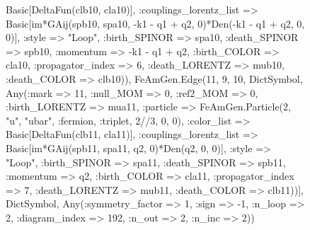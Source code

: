 \documentclass{revtex4}
\begin{document}
\begin{figure}[!htb]
\begin{center}
{Basic[DeltaFun(clb10, cla10)], :couplings_lorentz_list => Basic[im*GAij(spb10, spa10, -k1 - q1 + q2, 0)*Den(-k1 - q1 + q2, 0, 0)], :style => "Loop", :birth_SPINOR => spa10, :death_SPINOR => spb10, :momentum => -k1 - q1 + q2, :birth_COLOR => cla10, :propagator_index => 6, :death_LORENTZ => mub10, :death_COLOR => clb10)), FeAmGen.Edge(11, 9, 10, Dict{Symbol, Any}(:mark => 11, :null_MOM => 0, :ref2_MOM => 0, :birth_LORENTZ => mua11, :particle => FeAmGen.Particle(2, "u", "ubar", :fermion, :triplet, 2//3, 0, 0), :color_list => Basic[DeltaFun(clb11, cla11)], :couplings_lorentz_list => Basic[im*GAij(spb11, spa11, q2, 0)*Den(q2, 0, 0)], :style => "Loop", :birth_SPINOR => spa11, :death_SPINOR => spb11, :momentum => q2, :birth_COLOR => cla11, :propagator_index => 7, :death_LORENTZ => mub11, :death_COLOR => clb11))], Dict{Symbol, Any}(:symmetry_factor => 1, :sign => -1, :n_loop => 2, :diagram_index => 192, :n_out => 2, :n_inc => 2)) 
}
\end{center}
\end{figure}
\end{document}
